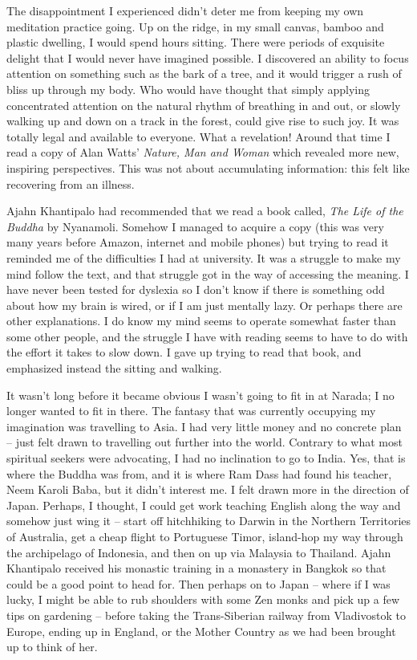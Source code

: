 The disappointment I experienced didn't deter me from keeping my own
meditation practice going. Up on the ridge, in my small canvas, bamboo
and plastic dwelling, I would spend hours sitting. There were periods of
exquisite delight that I would never have imagined possible. I
discovered an ability to focus attention on something such as the bark
of a tree, and it would trigger a rush of bliss up through my body. Who
would have thought that simply applying concentrated attention on the
natural rhythm of breathing in and out, or slowly walking up and down on
a track in the forest, could give rise to such joy. It was totally legal
and available to everyone. What a revelation! Around that time I read a
copy of Alan Watts' \emph{Nature, Man and Woman} which revealed more
new, inspiring perspectives. This was not about accumulating
information: this felt like recovering from an illness.

Ajahn Khantipalo had recommended that we read a book called, \emph{The
Life of the Buddha} by Nyanamoli. Somehow I managed to acquire a copy
(this was very many years before Amazon, internet and mobile phones) but
trying to read it reminded me of the difficulties I had at university.
It was a struggle to make my mind follow the text, and that struggle got
in the way of accessing the meaning. I have never been tested for
dyslexia so I don't know if there is something odd about how my brain is
wired, or if I am just mentally lazy. Or perhaps there are other
explanations. I do know my mind seems to operate somewhat faster than
some other people, and the struggle I have with reading seems to have to
do with the effort it takes to slow down. I gave up trying to read that
book, and emphasized instead the sitting and walking.

It wasn't long before it became obvious I wasn't going to fit in at
Narada; I no longer wanted to fit in there. The fantasy that was
currently occupying my imagination was travelling to Asia. I had very
little money and no concrete plan -- just felt drawn to travelling out
further into the world. Contrary to what most spiritual seekers were
advocating, I had no inclination to go to India. Yes, that is where the
Buddha was from, and it is where Ram Dass had found his teacher, Neem
Karoli Baba, but it didn't interest me. I felt drawn more in the
direction of Japan. Perhaps, I thought, I could get work teaching
English along the way and somehow just wing it -- start off hitchhiking
to Darwin in the Northern Territories of Australia, get a cheap flight
to Portuguese Timor, island-hop my way through the archipelago of
Indonesia, and then on up via Malaysia to Thailand. Ajahn Khantipalo
received his monastic training in a monastery in Bangkok so that could
be a good point to head for. Then perhaps on to Japan -- where if I was
lucky, I might be able to rub shoulders with some Zen monks and pick up
a few tips on gardening -- before taking the Trans-Siberian railway from
Vladivostok to Europe, ending up in England, or the Mother Country as we
had been brought up to think of her.

